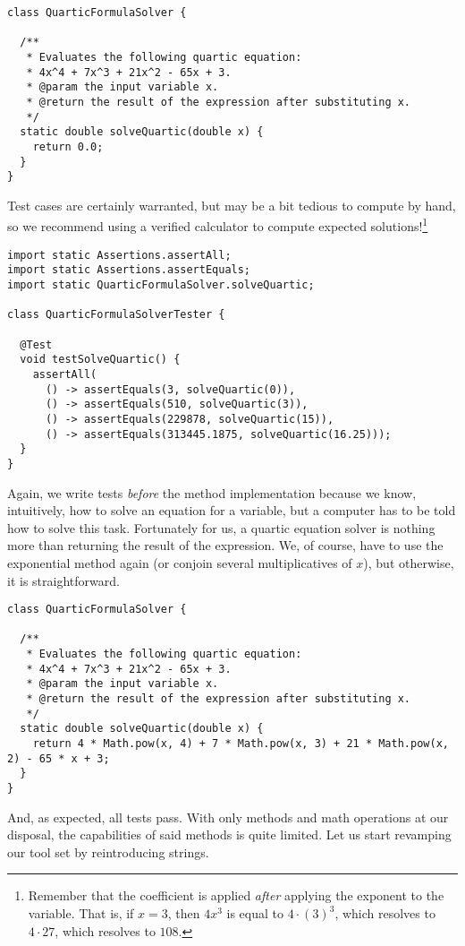 \begin{cl}{}
\begin{lstlisting}[language=MyJava]
class QuarticFormulaSolver {

  /**
   * Evaluates the following quartic equation:
   * 4x^4 + 7x^3 + 21x^2 - 65x + 3.
   * @param the input variable x.
   * @return the result of the expression after substituting x.
   */
  static double solveQuartic(double x) {
    return 0.0;
  }
}
\end{lstlisting}
\end{cl}

Test cases are certainly warranted, but may be a bit tedious to compute by hand, so we recommend using a verified calculator to compute expected solutions!\footnote{Remember that the coefficient is applied \textit{after} applying the exponent to the variable. That is, if $x=3$, then $4x^3$ is equal to $4 \cdot (3)^3$, which resolves to $4 \cdot 27$, which resolves to $108$.}

\begin{cl}{}
\begin{lstlisting}[language=MyJava]
import static Assertions.assertAll;
import static Assertions.assertEquals;
import static QuarticFormulaSolver.solveQuartic;

class QuarticFormulaSolverTester {

  @Test
  void testSolveQuartic() {
    assertAll(
      () -> assertEquals(3, solveQuartic(0)),
      () -> assertEquals(510, solveQuartic(3)),
      () -> assertEquals(229878, solveQuartic(15)),
      () -> assertEquals(313445.1875, solveQuartic(16.25)));
  }
}
\end{lstlisting}
\end{cl}

Again, we write tests \textit{before} the method implementation because we know, intuitively, how to solve an equation for a variable, but a computer has to be told how to solve this task. Fortunately for us, a quartic equation solver is nothing more than returning the result of the expression. We, of course, have to use the exponential  method again (or conjoin several multiplicatives of $x$), but otherwise, it is straightforward.

\begin{cl}{}
\begin{lstlisting}[language=MyJava]
class QuarticFormulaSolver {

  /**
   * Evaluates the following quartic equation:
   * 4x^4 + 7x^3 + 21x^2 - 65x + 3.
   * @param the input variable x.
   * @return the result of the expression after substituting x.
   */
  static double solveQuartic(double x) {
    return 4 * Math.pow(x, 4) + 7 * Math.pow(x, 3) + 21 * Math.pow(x, 2) - 65 * x + 3;
  }
}
\end{lstlisting}
\end{cl}

And, as expected, all tests pass. With only methods and math operations at our disposal, the capabilities of said methods is quite limited. Let us start revamping our tool set by reintroducing strings.